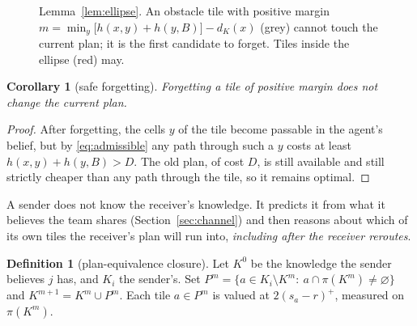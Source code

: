 \documentclass[11pt,a4paper]{article}
\newtheorem{corollary}{Corollary}
\theoremstyle{definition}
\newtheorem{definition}{Definition}
\newcommand{\pos}[1]{\left(#1\right)^{+}}
\begin{document}
\begin{figure}[t]\centering
{}
\caption{Lemma~\ref{lem:ellipse}. An obstacle tile with positive margin $m=\min_{y}\big[h(x,y)+h(y,B)\big]-d_K(x)$ (grey) cannot touch the current plan; it is the first candidate to forget. Tiles inside the ellipse (red) may.}
\label{fig:ellipse}
\end{figure}

\begin{corollary}[safe forgetting]\label{cor:forget}
Forgetting a tile of positive margin does not change the current plan.
\end{corollary}
\begin{proof}
After forgetting, the cells $y$ of the tile become passable in the agent's belief, but by \eqref{eq:admissible} any path through such a $y$ costs at least $h(x,y)+h(y,B)>D$. The old plan, of cost $D$, is still available and still strictly cheaper than any path through the tile, so it remains optimal.
\end{proof}

A sender does not know the receiver's knowledge. It predicts it from what it believes the team shares (Section~\ref{sec:channel}) and then reasons about which of its own tiles the receiver's plan will run into, \emph{including after the receiver reroutes}.

\begin{definition}[plan-equivalence closure]\label{def:closure}
Let $K^0$ be the knowledge the sender believes $j$ has, and $K_i$ the sender's. Set $P^m=\{a\in K_i\setminus K^m:\ a\cap\pi(K^m)\ne\varnothing\}$ and $K^{m+1}=K^m\cup P^m$. Each tile $a\in P^m$ is valued at $2\pos{s_a-r}$, measured on $\pi(K^m)$.
\end{definition}
\end{document}
